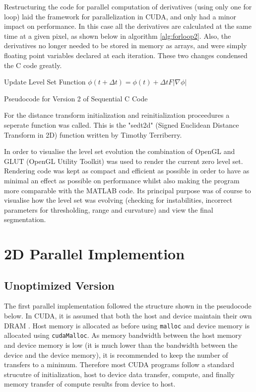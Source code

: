 Restructuring the code for parallel computation of derivatives (using only one for loop) laid the framework for parallelization in CUDA, and only had a minor impact on performance. In this case all the derivatives are calculated at the same time at a given pixel, as shown below in algorithm \ref{alg:forloop2}. Also, the derivatives no longer needed to be stored in memory as arrays, and were simply floating point variables declared at each iteration. These two changes condensed the C code greatly.


\begin{algorithm}[h]
\dontprintsemicolon
{}
\BlankLine
Update Level Set Function $\phi(t+\Delta t) =\phi(t) + \Delta t F|\nabla\phi|$\;
\caption{Pseudocode for Version 2 of Sequential C Code}\label{alg:forloop2}
\end{algorithm}

For the distance transform initialization and reinitialization proceedures a seperate function was called. This is the "sedt2d" (Signed Euclidean Distance Transform in 2D) function written by Timothy Terriberry.

In order to visualise the level set evolution the combination of OpenGL and GLUT (OpenGL Utility Toolkit) was used to render the current zero level set. Rendering code was kept as compact and efficient as possible in order to have as minimal an effect as possible on performance whilst also making the program more comparable with the MATLAB code. Its principal purpose was of course to visualise how the level set was evolving (checking for instabilities, incorrect parameters for thresholding, range and curvature) and view the final segmentation. 

\section{2D Parallel Implemention}
	\subsection{Unoptimized Version}
The first parallel implementation followed the structure shown in the pseudocode below. In CUDA, it is assumed that both the host and device maintain their own DRAM \cite{cuda}. Host memory is allocated as before using \texttt{malloc} and device memory is allocated using \texttt{cudaMalloc}. As memory bandwidth between the host memory and device memory is low (it is much lower than the bandwidth between the device and the device memory), it is recommended to keep the number of transfers to a minimum. Therefore most CUDA programs follow a standard strucutre of initialization, host to device data transfer, compute, and finally memory transfer of compute results from device to host. 

